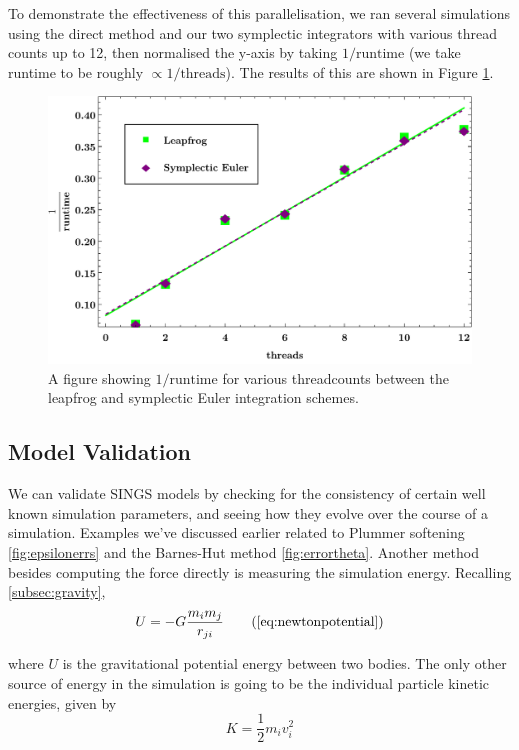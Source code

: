 \documentclass[12pt, twoside, letterpaper]{article}
\begin{document}
To demonstrate the effectiveness of this parallelisation, we ran several simulations using the direct method and our two symplectic integrators with various thread counts up to 12, then normalised the y-axis by taking $1/\text{runtime}$ (we take runtime to be roughly $\propto 1/\text{threads}$). The results of this are shown in Figure \ref{fig:runtimethreads}.
\begin{figure}[h]
\caption{A figure showing $1/\text{runtime}$ for various threadcounts between the leapfrog and symplectic Euler integration schemes.}
\centerline{\includegraphics[width=.75\textwidth]{threadsruntime.pdf}}
\label{fig:runtimethreads}
\end{figure}


\subsection{Model Validation} \label{subsec:validation}
We can validate SINGS models by checking for the consistency of certain well known simulation parameters, and seeing how they evolve over the course of a simulation. Examples we've discussed earlier related to Plummer softening \ref{fig:epsilonerrs} and the Barnes-Hut method \ref{fig:errortheta}. Another method besides computing the force directly is measuring the simulation energy. Recalling \ref{subsec:gravity}, 
\begin{equation}
	U = -G \dfrac{m_im_j}{r_{ji}}
	\tag{\ref{eq:newtonpotential}}
\end{equation}

\noindent where $U$ is the gravitational potential energy between two bodies. The only other source of energy in the simulation is going to be the individual particle kinetic energies, given by
\begin{equation} \label{eq:ke}
	K = \frac{1}{2}m_i v_i^2
\end{equation}
\end{document}
